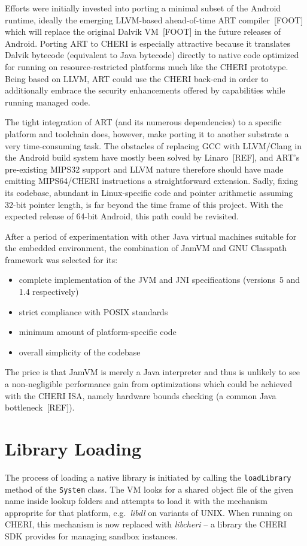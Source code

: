 \documentclass[a4paper,12pt,twoside,openright]{report}
\newcommand{\class}[1]{\texttt{#1}}
\newcommand{\tool}[1]{\emph{#1}}
\newcommand{\lib}[1]{\tool{lib#1}}
\begin{document}
Efforts were initially invested into porting a minimal subset of the Android runtime, ideally the emerging LLVM-based ahead-of-time ART compiler~[FOOT] which will replace the original Dalvik VM~[FOOT] in the future releases of Android. Porting ART to CHERI is especially attractive because it translates Dalvik bytecode (equivalent to Java bytecode) directly to native code optimized for running on resource-restricted platforms much like the CHERI prototype. Being based on LLVM, ART could use the CHERI back-end in order to additionally embrace the security enhancements offered by capabilities while running managed code.

The tight integration of ART (and its numerous dependencies) to a specific platform and toolchain does, however, make porting it to another substrate a very time-consuming task. The obstacles of replacing GCC with LLVM{\slash}Clang in the Android build system have mostly been solved by Linaro~[REF], and ART's pre-existing MIPS32 support and LLVM nature therefore should have made emitting MIPS64/CHERI instructions a straightforward extension. Sadly, fixing its codebase, abundant in Linux-specific code and pointer arithmetic assuming 32-bit pointer length, is far beyond the time frame of this project. With the expected release of 64-bit Android, this path could be revisited.

After a period of experimentation with other Java virtual machines suitable for the embedded environment, the combination of JamVM and GNU Classpath framework was selected for its:
\begin{itemize}
\item complete implementation of the JVM and JNI specifications (versions~5 and 1.4 respectively)
\item strict compliance with POSIX standards
\item minimum amount of platform-specific code
\item overall simplicity of the codebase
\end{itemize}
The price is that JamVM is merely a Java interpreter and thus is unlikely to see a non-negligible performance gain from optimizations which could be achieved with the CHERI ISA, namely hardware bounds checking (a common Java bottleneck~[REF]).

\section{Library Loading}

The process of loading a native library is initiated by calling the \texttt{loadLibrary} method of the \class{System} class. The VM looks for a shared object file of the given name inside lookup folders and attempts to load it with the mechanism approprite for that platform, e.g.\ \lib{dl} on variants of UNIX. When running on CHERI, this mechanism is now replaced with \lib{cheri} -- a library the CHERI SDK provides for managing sandbox instances. 
\end{document}
